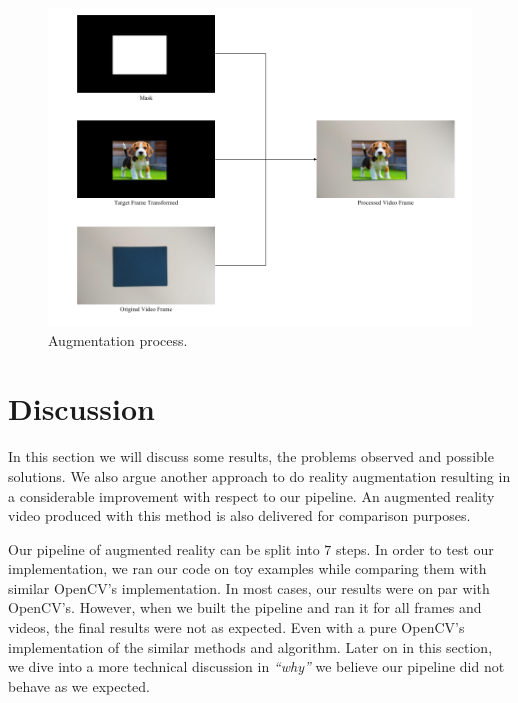 \documentclass[]{IEEEtran}
\begin{document}
\begin{figure}[h]
  \includegraphics[width=\linewidth]{./figures/augmentation/resizing.png}
  \caption{Augmentation process.}
  \label{fig:augmentation}
\end{figure}

\section{Discussion}
\label{sec:disc}
In this section we will discuss some results, the problems observed and possible solutions. We also argue another approach to do reality augmentation resulting in a considerable improvement with respect to our pipeline. An augmented reality video produced with this method is also delivered for comparison purposes.

Our pipeline of augmented reality can be split into $7$ steps. In order to test our implementation, we ran our code on toy examples while comparing them with similar OpenCV's implementation. In most cases, our results were on par with OpenCV's. However, when we built the pipeline and ran it for all frames and videos, the final results were not as expected. Even with a pure OpenCV's implementation of the similar methods and algorithm. Later on in this section, we dive into a more technical discussion in \textit{``why''} we believe our pipeline did not behave as we expected.
\end{document}
